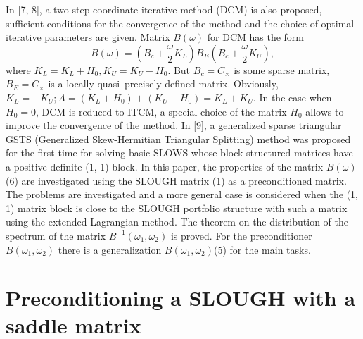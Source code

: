 \documentclass{article}
\begin{document}
In [7, 8], a two-step coordinate iterative method (DCM) is also proposed, sufficient conditions for the convergence of the method and the choice of optimal iterative parameters are given. Matrix \(B(\omega) \) for DCM has the form
\[ B(\omega) = \left(B_c + \frac{\omega}{2} K_L\right)B_E \left(B_c + \frac{\omega}{2} K_U\right), \]
where \(K_L = K_L + H_0, K_U = K_U - H_0 \). But \(B_c = C_{\times}\) is some sparse matrix, \(B_E=C_{\times}\) is a locally quasi–precisely defined matrix. Obviously, \(K_L = -K_U; A = (K_L + H_0) + (K_U - H_0) = K_L + K_U \). 
In the case when \(H_0 = 0\), DCM is reduced to ITCM, a special choice of the matrix \(H_0\) allows to improve the convergence of the method.
In [9], a generalized sparse triangular GSTS (Generalized Skew-Hermitian Triangular Splitting) method was proposed for the first time for solving basic SLOWS whose block-structured matrices have a positive definite (1, 1) block.
In this paper, the properties of the matrix \(B(\omega)\) (6) are investigated using the SLOUGH matrix (1) as a preconditioned matrix. The problems are investigated and a more general case is considered when the (1, 1) matrix block is close to the SLOUGH portfolio structure with such a matrix using the extended Lagrangian method. The theorem on the distribution of the spectrum of the matrix \(B^{-1}(\omega_1, \omega_2) \) is proved. For the preconditioner \(B(\omega_1, \omega_2) \) there is a generalization \(B(\omega_1, \omega_2) \)(5) for the main tasks.

\section*{Preconditioning a SLOUGH with a saddle matrix}
\end{document}
